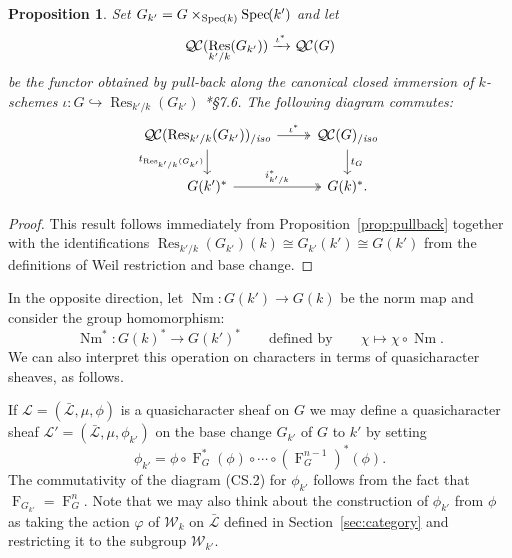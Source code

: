 \documentclass[11pt]{amsart}
\theoremstyle{plain}
\newtheorem{proposition}[theorem]{Proposition}
\theoremstyle{definition}
\theoremstyle{remark}
\newcommand{\Spec}[1]{{\operatorname{Spec}\hskip-1pt( #1 )}}
\newcommand{\Frob}[1]{\operatorname{F}_{#1}}
\DeclareMathOperator{\Res}{Res}
\DeclareMathOperator{\Nm}{Nm}
\newcommand{\qcs}[1]{{\mathcal{#1}}}
\newcommand{\gqcs}[1]{{\mathcal{\bar #1}}}
\newcommand{\QC}{{\mathcal{Q\hskip-0.8pt C}}}
\newcommand{\QCiso}[1]{\QC(#1)_{/\textit{iso}}}
\newcommand{\Weil}[1]{\mathcal{W}_{#1}}
\newcommand{\trFrob}[1]{t_{#1}}
\begin{document}
\begin{proposition} \label{prop:csbe}
Set $G_{k'} = G\times_\Spec{k} \Spec{k'}$ and let
\[
\QC(\Res_{k'/k}(G_{k'})) \xrightarrow{\iota^*} \QC(G)
\]
be the functor obtained by pull-back along the canonical closed immersion of $k$-schemes
$\iota : G \hookrightarrow \Res_{k'/k}(G_{k'})$
\cite{bosch-lutkebohmert-reynaud:NeronModels}*{\S 7.6}. 
The following diagram commutes:
\[
\begin{tikzcd}
\QCiso{\Res_{k'/k}(G_{k'})} \arrow[two heads]{r}{\iota^*} \dar[swap]{\trFrob{\Res_{k'/k}(G_{k'})}} & \QCiso{G} \dar{\trFrob{G}} \\
G(k')^* \arrow[two heads]{r}{i_{k'/k}^*} & G(k)^*.
\end{tikzcd}
\]
\end{proposition}
\begin{proof}
This result follows immediately from Proposition~\ref{prop:pullback} together with the identifications
$\Res_{k'/k}(G_{k'})(k) \cong G_{k'}(k') \cong G(k')$ from the definitions of Weil restriction and base change.
\end{proof}

In the opposite direction, let $\Nm : G(k') \to G(k)$ be the norm map and consider the group homomorphism:
\[
\Nm^* : G(k)^* \to G(k')^* \qquad \text{defined by}\qquad \chi \mapsto \chi\circ \Nm.
\]
We can also interpret this operation on characters in terms of quasicharacter sheaves, as follows.

If $\qcs{L} = (\gqcs{L}, \mu, \phi)$ is a quasicharacter sheaf on $G$ we may define
a quasicharacter sheaf $\qcs{L}' = (\gqcs{L}, \mu, \phi_{k'})$ on the base change
$G_{k'}$ of $G$ to $k'$ by setting
\[
\phi_{k'} = \phi \circ \Frob{G}^*(\phi) \circ \cdots \circ (\Frob{G}^{n-1})^*(\phi).
\]
The commutativity of the diagram (CS.2) for $\phi_{k'}$ 
follows from the fact that $\Frob{G_{k'}} = \Frob{G}^n$.
Note that we may also think about the construction of $\phi_{k'}$ from $\phi$
as taking the action $\varphi$ of $\Weil{k}$ on $\gqcs{L}$ 
defined in Section~\ref{sec:category} and restricting it to the subgroup $\Weil{k'}$.
\end{document}
